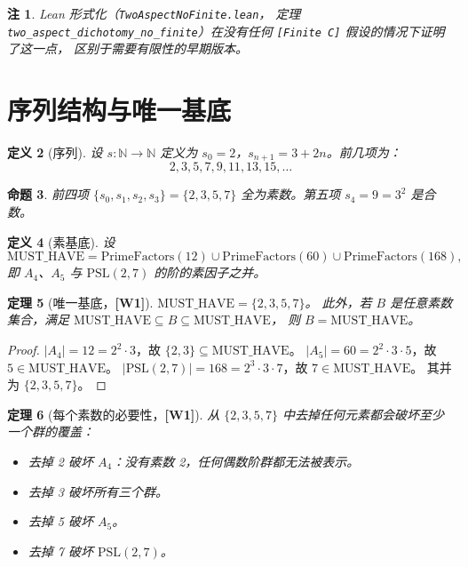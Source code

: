 \documentclass[11pt]{ctexart}
\newcommand{\wone}[1]{\textcolor{wcolor}{\textbf{[#1]}}}
\newtheorem{theorem}{定理}
\newtheorem{definition}[theorem]{定义}
\newtheorem{proposition}[theorem]{命题}
\newtheorem{remark}[theorem]{注}
\begin{document}
\begin{remark}
Lean 形式化（\texttt{TwoAspectNoFinite.lean}，
定理 \texttt{two\_aspect\_dichotomy\_no\_finite}）在没有任何
\texttt{[Finite C]} 假设的情况下证明了这一点，
区别于需要有限性的早期版本。
\end{remark}

\section{序列结构与唯一基底}
\label{sec:sequence}

\begin{definition}[序列]
设 $s : \mathbb{N} \to \mathbb{N}$ 定义为
$s_0 = 2$，$s_{n+1} = 3 + 2n$。前几项为：
\[
2, 3, 5, 7, 9, 11, 13, 15, \ldots
\]
\end{definition}

\begin{proposition}
前四项 $\{s_0, s_1, s_2, s_3\} = \{2, 3, 5, 7\}$
全为素数。第五项 $s_4 = 9 = 3^2$ 是合数。
\end{proposition}

\begin{definition}[素基底]
设
\[
\mathrm{MUST\_HAVE}
  = \mathrm{PrimeFactors}(12)
  \cup \mathrm{PrimeFactors}(60)
  \cup \mathrm{PrimeFactors}(168),
\]
即 $A_4$、$A_5$ 与 $\mathrm{PSL}(2,7)$ 的阶的素因子之并。
\end{definition}

\begin{theorem}[唯一基底，\wone{W1}]
\label{thm:unique}
$\mathrm{MUST\_HAVE} = \{2, 3, 5, 7\}$。
此外，若 $B$ 是任意素数集合，满足
$\mathrm{MUST\_HAVE} \subseteq B \subseteq \mathrm{MUST\_HAVE}$，
则 $B = \mathrm{MUST\_HAVE}$。
\end{theorem}

\begin{proof}
$|A_4| = 12 = 2^2 \cdot 3$，故 $\{2, 3\} \subseteq
\mathrm{MUST\_HAVE}$。
$|A_5| = 60 = 2^2 \cdot 3 \cdot 5$，故 $5 \in
\mathrm{MUST\_HAVE}$。
$|\mathrm{PSL}(2,7)| = 168 = 2^3 \cdot 3 \cdot 7$，故
$7 \in \mathrm{MUST\_HAVE}$。
其并为 $\{2, 3, 5, 7\}$。
\end{proof}

\begin{theorem}[每个素数的必要性，\wone{W1}]
\label{thm:necessity}
从 $\{2, 3, 5, 7\}$ 中去掉任何元素都会破坏至少一个群的覆盖：
\begin{itemize}
\item 去掉 2 破坏 $A_4$：没有素数 2，任何偶数阶群都无法被表示。
\item 去掉 3 破坏所有三个群。
\item 去掉 5 破坏 $A_5$。
\item 去掉 7 破坏 $\mathrm{PSL}(2,7)$。
\end{itemize}
\end{theorem}
\end{document}
